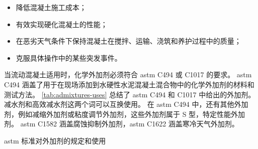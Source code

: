 \begin{itemize}
  \item 降低混凝土施工成本；
  \item 有效实现硬化混凝土的性能；
  \item 在恶劣天气条件下保持混凝土在搅拌、运输、浇筑和养护过程中的质量；
  \item 克服具体操作中的某些突发事件。
\end{itemize}

当流动混凝土适用时，化学外加剂必须符合 \acrshort*{astm} C494 或 C1017 的要求。 \acrshort*{astm} C494 涵盖了用于在现场添加到水硬性水泥混凝土混合物中的化学外加剂的材料和测试方法。 \cref{tab:admixtures-uses} 总结了 \acrshort*{astm} C494 和 C1017 中给出的外加剂。 减水剂和高效减水剂这两个词可以互换使用。 在 \acrshort*{astm} C494 中，还有其他外加剂，例如减缩外加剂或粘度调节外加剂，这些外加剂属于 S 型，特定性能外加剂。 \acrshort*{astm} C1582 涵盖腐蚀抑制外加剂，\acrshort*{astm} C1622 涵盖寒冷天气外加剂。

\begin{table}
  \caption{\acrshort*{astm} 标准对外加剂的规定和使用}
  \label{tab:admixtures-uses}
  
\end{table}

